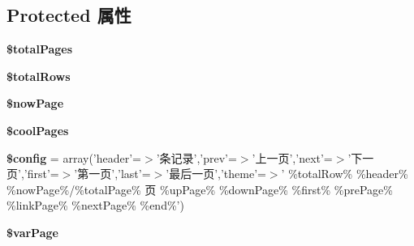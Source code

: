 \subsection*{Protected 属性}
\begin{DoxyCompactItemize}
\item 
\hypertarget{classPage_ab51019de98bc6f20aa03c7cfda6b7d93}{{\bfseries \$total\+Pages}}\label{classPage_ab51019de98bc6f20aa03c7cfda6b7d93}

\item 
\hypertarget{classPage_a672190f7c1130ae519aeafd1a97dd016}{{\bfseries \$total\+Rows}}\label{classPage_a672190f7c1130ae519aeafd1a97dd016}

\item 
\hypertarget{classPage_a79021b9783d5f45932ad714badf3d827}{{\bfseries \$now\+Page}}\label{classPage_a79021b9783d5f45932ad714badf3d827}

\item 
\hypertarget{classPage_ae7ccbadf843ba70a6bbe15b78a4c7003}{{\bfseries \$cool\+Pages}}\label{classPage_ae7ccbadf843ba70a6bbe15b78a4c7003}

\item 
\hypertarget{classPage_a2aec6c093b4a3699b9d81d842ba456b9}{{\bfseries \$config} = array('header'=$>$'条记录','prev'=$>$'上一页','next'=$>$'下一页','first'=$>$'第一页','last'=$>$'最后一页','theme'=$>$' \%total\+Row\% \%header\% \%now\+Page\%/\%total\+Page\% 页 \%up\+Page\% \%down\+Page\% \%first\% \%pre\+Page\% \%link\+Page\% \%next\+Page\% \%end\%')}\label{classPage_a2aec6c093b4a3699b9d81d842ba456b9}

\item 
\hypertarget{classPage_a3027e4e889b5efe3d3b07fb9db7d36f4}{{\bfseries \$var\+Page}}\label{classPage_a3027e4e889b5efe3d3b07fb9db7d36f4}

\end{DoxyCompactItemize}



